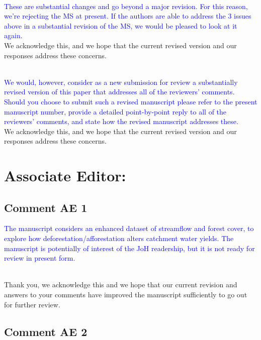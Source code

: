 \documentclass[]{elsarticle} %
\begin{document}
\begin{itemize}
  \strut \\
\end{itemize}

\textcolor{blue}{These are substantial changes and go beyond a major revision.  For this reason, we're rejecting the MS at present.  If the authors are able to address the 3 issues above in a substantial revision of the MS, we would be pleased to look at it again.}\\
We acknowledge this, and we hope that the current revised version and our responses address these concerns.\\
\strut \\
\textcolor{blue}{We would, however, consider as a new submission for review a substantially revised version of this paper that addresses all of the reviewers' comments.  Should you choose to submit such a revised manuscript please refer to the present manuscript number, provide a detailed point-by-point reply to all of the reviewers' comments, and state how the revised manuscript addresses these.}\\
We acknowledge this, and we hope that the current revised version and our responses address these concerns.\\

\hypertarget{associate-editor}{%
\section{Associate Editor:}\label{associate-editor}}

\hypertarget{comment-ae-1}{%
\subsection{Comment AE 1}\label{comment-ae-1}}

\textcolor{blue}{The manuscript considers an enhanced dataset of streamflow and forest cover, to explore how deforestation/afforestation alters catchment water yields. The manuscript is potentially of interest of the JoH readership, but it is not ready for review in present form.}\\
\strut \\
Thank you, we acknowledge this and we hope that our current revision and answers to your comments have improved the manuscript sufficiently to go out for further review.

\hypertarget{comment-ae-2}{%
\subsection{Comment AE 2}\label{comment-ae-2}}
\end{document}
